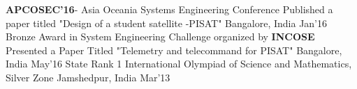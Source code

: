 \begin{cvhonors}
	\cvhonor
	{\textbf{APCOSEC'16}- Asia Oceania Systems Engineering Conference}
	{Published a paper titled "Design of a student satellite -PISAT"}
	{Bangalore, India}
	{Jan'16}
	\cvhonor
	{Bronze Award in System Engineering Challenge organized by \textbf{INCOSE}}
	{Presented a Paper Titled "Telemetry and telecommand for PISAT"}
	{Bangalore, India}
	{May'16}
	\cvhonor
	{State Rank 1}
	{International Olympiad of Science and Mathematics, Silver Zone}
	{Jamshedpur, India}
	{Mar'13}
\end{cvhonors}

